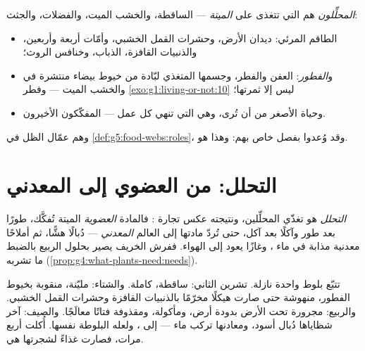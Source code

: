 \begin{definition}\label{def:g6:decomposers-and-soil:decomposers}
\emph{المحلِّلون} هم  التي تتغذى على
\emph{ الميتة} ---  الساقطة، والخشب الميت،
والفضلات، والجثث:
\begin{itemize}
  \item الطاقم المرئي: ديدان الأرض، وحشرات القمل الخشبي، وأمّات
        أربعة وأربعين، والذنبيات القافزة،  الذباب، وخنافس
        الروث؛
  \item و\emph{الفطور}: العفن والفطر، وجسمها المتغذي
        لبّادة من خيوط بيضاء منتشرة في  والخشب الميت ---
        وفطر \cref{exo:g1:living-or-not:10} ليس إلا ثمرتها؛
  \item وحياة  الأصغر من أن تُرى، وهي التي تنهي كل عمل ---
        المفكّكون الأخيرون.
\end{itemize}
وهم عمّال الظل في \cref{def:g5:food-webs:roles}، وقد وُعدوا بفصل
خاص بهم: وهذا هو.
\end{definition}

\section{التحلل: من العضوي إلى المعدني}

\begin{proposition}\label{prop:g6:decomposers-and-soil:decomposition}
\emph{التحلل} هو تغذّي المحلِّلين، ونتيجته عكس تجارة
: فالمادة \emph{العضوية} الميتة تُفكَّك، طورًا بعد طور
وآكلًا بعد آكل، حتى تُردّ مادتها إلى العالم \emph{المعدني} ---
دُبالًا هشًّا، ثم أملاحًا معدنية مذابة في ماء ، وغازًا يعود
إلى الهواء. ففرش الخريف يصير بحلول الربيع بالضبط ما تشربه 
(\cref{prop:g4:what-plants-need:needs}).
\end{proposition}
\admitted

\begin{example}\label{ex:g6:decomposers-and-soil:leaf}
تتبّع  بلوط واحدة نازلة. تشرين الثاني: ساقطة، كاملة. والشتاء:
مليّنة، منقوبة بخيوط الفطور، منهوشة حتى صارت هيكلًا مخرّمًا
بالذنبيات القافزة وحشرات القمل الخشبي. والربيع: مجرورة تحت الأرض
بدودة أرض، ومأكولة، ومقذوفة فتاتًا معالَجًا. والصيف: آخر شظاياها
دُبال أسود، ومعادنها تركب ماء  --- إلى ، ولعله 
البلوطة نفسها. أُكلت أربع مرات، فصارت  غذاءً لشجرتها هي.
\end{example}


